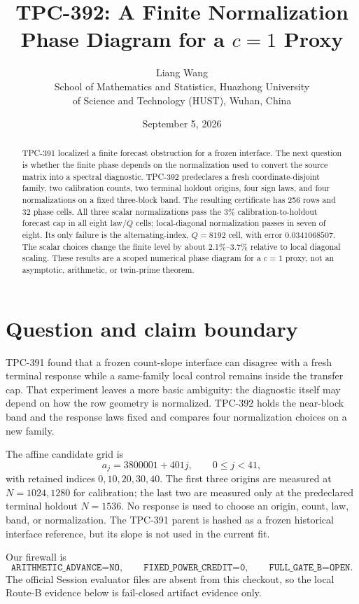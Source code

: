 \documentclass[10pt]{article}
\title{TPC-392: A Finite Normalization Phase Diagram for a $c=1$ Proxy}
\author{Liang Wang\\
School of Mathematics and Statistics, Huazhong University\\
of Science and Technology (HUST), Wuhan, China}
\date{September 5, 2026}
\begin{document}
\maketitle

\begin{abstract}
TPC-391 localized a finite forecast obstruction for a frozen interface.  The
next question is whether the finite phase depends on the normalization used
to convert the source matrix into a spectral diagnostic.  TPC-392 predeclares
a fresh coordinate-disjoint family, two calibration counts, two terminal
holdout origins, four sign laws, and four normalizations on a fixed
three-block band.  The resulting certificate has 256 rows and 32 phase
cells.  All three scalar normalizations pass the 3\% calibration-to-holdout
forecast cap in all eight law/$Q$ cells; local-diagonal normalization passes
in seven of eight.  Its only failure is the alternating-index, $Q=8192$ cell,
with error $0.0341068507$.  The scalar choices change the finite level by
about 2.1\%--3.7\% relative to local diagonal scaling.  These results are a
scoped numerical phase diagram for a $c=1$ proxy, not an asymptotic,
arithmetic, or twin-prime theorem.
\end{abstract}

\section{Question and claim boundary}

TPC-391 found that a frozen count-slope interface can disagree with a fresh
terminal response while a same-family local control remains inside the
transfer cap.  That experiment leaves a more basic ambiguity: the diagnostic
itself may depend on how the row geometry is normalized.  TPC-392 holds the
near-block band and the response laws fixed and compares four normalization
choices on a new family.

The affine candidate grid is
\[
 a_j=3800001+401j,\qquad 0\leq j<41,
\]
with retained indices $0,10,20,30,40$.  The first three origins are measured
at $N=1024,1280$ for calibration; the last two are measured only at the
predeclared terminal holdout $N=1536$.  No response is used to choose an
origin, count, law, band, or normalization.  The TPC-391 parent is hashed as
a frozen historical interface reference, but its slope is not used in the
current fit.

Our firewall is
\[
 \texttt{ARITHMETIC\_ADVANCE=NO},\qquad
 \texttt{FIXED\_POWER\_CREDIT=0},\qquad
 \texttt{FULL\_GATE\_B=OPEN}.
\]
The official Session evaluator files are absent from this checkout, so the
local Route-B evidence below is fail-closed artifact evidence only.
\end{document}
